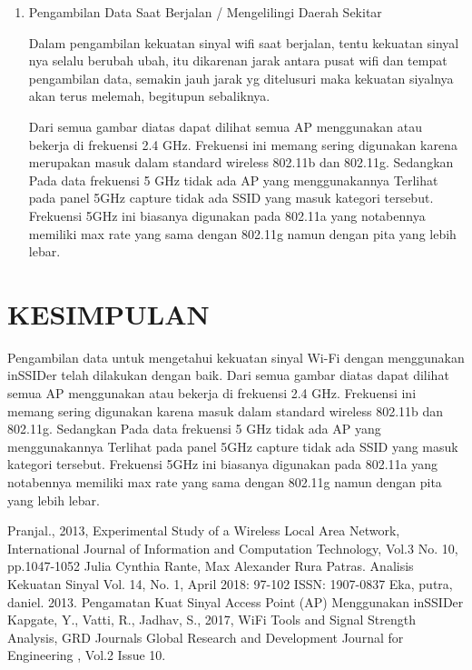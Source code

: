 \documentclass[conference]{IEEEtran}
\begin{document}
\begin{enumerate}
    \item Pengambilan Data Saat Berjalan / Mengelilingi Daerah Sekitar
    
    \vspace{0.2cm}
    Dalam pengambilan kekuatan sinyal wifi saat berjalan, tentu kekuatan sinyal nya selalu berubah ubah, 
    itu dikarenan jarak antara pusat wifi dan tempat pengambilan data, semakin jauh jarak yg ditelusuri maka kekuatan siyalnya akan terus melemah, 
    begitupun sebaliknya.

    \vspace{0.4cm}
    Dari semua gambar diatas dapat dilihat semua AP menggunakan atau bekerja di frekuensi 2.4 GHz. Frekuensi ini memang sering digunakan karena merupakan masuk dalam standard wireless 802.11b dan 802.11g. Sedangkan Pada data frekuensi 5 GHz tidak ada AP yang menggunakannya Terlihat pada panel 5GHz capture tidak ada SSID yang masuk kategori tersebut. Frekuensi 5GHz ini biasanya digunakan pada 802.11a yang notabennya memiliki max rate yang sama dengan 802.11g namun dengan pita yang lebih lebar.
    \end{enumerate}
    
    \vspace{0.2cm}
    \section{KESIMPULAN}
    \vspace{0.2cm}
    
    Pengambilan data untuk mengetahui kekuatan sinyal Wi-Fi dengan menggunakan inSSIDer telah dilakukan dengan baik. Dari semua gambar diatas dapat dilihat semua AP menggunakan atau bekerja di frekuensi 2.4 GHz. Frekuensi ini memang sering digunakan karena masuk dalam
    standard wireless 802.11b dan 802.11g. Sedangkan Pada data frekuensi 5 GHz tidak ada AP yang menggunakannya Terlihat pada panel 5GHz capture tidak ada SSID yang masuk kategori tersebut. Frekuensi 5GHz ini biasanya digunakan pada 802.11a yang notabennya memiliki max rate yang sama dengan 802.11g namun dengan pita yang lebih lebar.


\begin{thebibliography}{00}
     Pranjal., 2013, Experimental Study of a Wireless Local Area Network, International Journal of Information and Computation Technology, Vol.3 No. 10, pp.1047-1052
     Julia Cynthia Rante, Max Alexander Rura Patras. Analisis Kekuatan Sinyal Vol. 14, No. 1, April 2018: 97-102 ISSN: 1907-0837
     Eka, putra, daniel. 2013. Pengamatan Kuat Sinyal Access Point (AP) Menggunakan inSSIDer
     Kapgate, Y., Vatti, R., Jadhav, S., 2017, WiFi Tools and Signal Strength Analysis, GRD Journals Global Research and Development Journal for Engineering , Vol.2 Issue 10.
\end{thebibliography}
\end{document}
